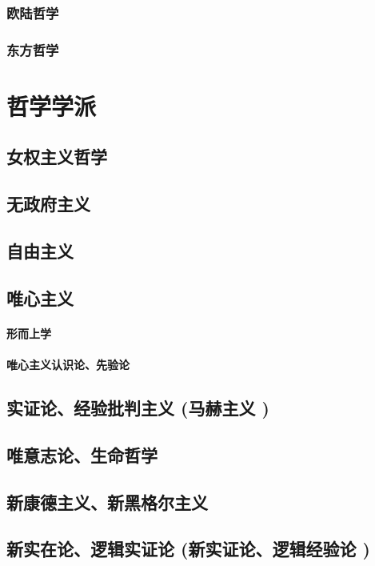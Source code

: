 \documentclass[UTF8]{../RepresentationUniverse}
\begin{document}
    \subsection{欧陆哲学}
    \subsection{东方哲学}




\chapter{哲学学派}
  

    \section{女权主义哲学}
    \section{无政府主义}
    \section{自由主义}


    \section{唯心主义}
        \subsubsection{形而上学}
        \subsubsection{唯心主义认识论、先验论}

    \section{实证论、经验批判主义 (马赫主义 )}
    \section{唯意志论、生命哲学}
    \section{新康德主义、新黑格尔主义}
    \section{新实在论、逻辑实证论 (新实证论、逻辑经验论 )}
\end{document}
